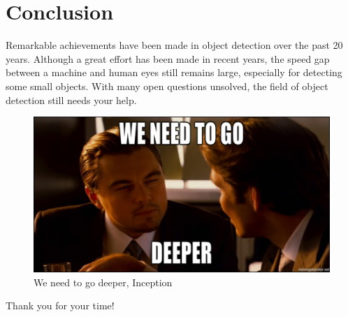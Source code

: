 \documentclass{beamer}
\begin{document}
\section{Conclusion}

\begin{frame}{}

Remarkable achievements have been made in object detection over the past 20 years. Although a great effort has been made in recent years, the speed gap between a machine and human eyes still remains large, especially for detecting some small objects. With many open questions unsolved, the field of object detection still needs your help.
        \begin{figure}
                \centering
                \includegraphics[width=0.5\linewidth]{godeeper.png}
                \caption{We need to go deeper, Inception}
                \label{fig:my_label}
        \end{figure}
    
\end{frame}

\begin{frame}[allowframebreaks]
    
    
\end{frame}

\begin{frame}
    \begin{center}
        {\Huge\calligra }
    
        {\Huge\calligra Thank you for your time!}
    \end{center}
\end{frame}
\end{document}
